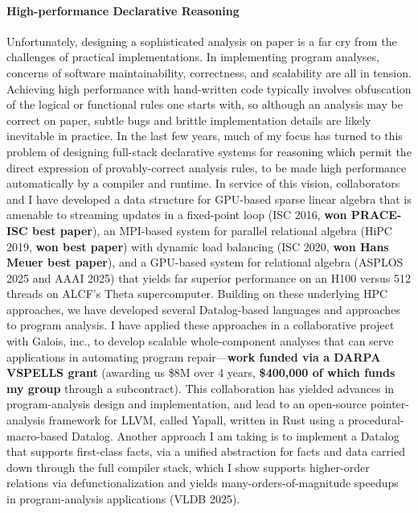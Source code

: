 \documentclass[12pt]{article}
\begin{document}
\paragraph*{High-performance Declarative Reasoning}
%
Unfortunately, designing a sophisticated analysis on paper is a far cry from the challenges of practical implementations. In implementing program analyses, concerns of software maintainability, correctness, and scalability are all in tension. Achieving high performance with hand-written code typically involves obfuscation of the logical or functional rules one starts with, so although an analysis may be correct on paper, subtle bugs and brittle implementation details are likely inevitable in practice. In the last few years, much of my focus has turned to this problem of designing full-stack declarative systems for reasoning which permit the direct expression of provably-correct analysis rules, to be made high performance automatically by a compiler and runtime. In service of this vision, collaborators and I have developed a data structure for GPU-based sparse linear algebra that is amenable to streaming updates in a fixed-point loop (ISC 2016, \textbf{won PRACE-ISC best paper}), an MPI-based system for parallel relational algebra (HiPC 2019, \textbf{won best paper}) with dynamic load balancing (ISC 2020, \textbf{won Hans Meuer best paper}), and a GPU-based system for relational algebra (ASPLOS 2025 and AAAI 2025) that yields far superior performance on an H100 versus 512 threads on ALCF's Theta supercomputer. Building on these underlying HPC approaches, we have developed several Datalog-based languages and approaches to program analysis. I have applied these approaches in a collaborative project with Galois, inc., to develop scalable whole-component analyses that can serve applications in automating program repair---\textbf{work funded via a DARPA VSPELLS grant} (awarding us \$8M over 4 years, \textbf{\$400,000 of which funds my group} through a subcontract). This collaboration has yielded advances in program-analysis design and implementation, and lead to an open-source pointer-analysis framework for LLVM, called Yapall, written in Rust using a procedural-macro-based Datalog. Another approach I am taking is to implement a Datalog that supports first-class facts, via a unified abstraction for facts and data carried down through the full compiler stack, which I show supports higher-order relations via defunctionalization and yields many-orders-of-magnitude speedups in program-analysis applications (VLDB 2025). 
\end{document}
